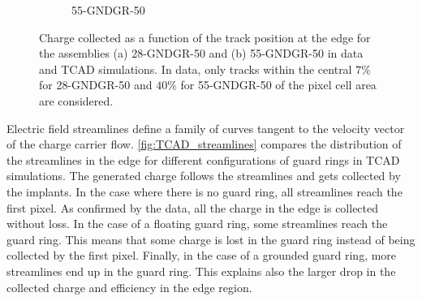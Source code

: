 \begin{figure}[htbp]
\begin{subfigure}[b]{0.45\textwidth}
    \caption{55-GNDGR-50}
  \end{subfigure}
  \caption{Charge collected as a function of the track position at the
    edge for the assemblies (a) 28-GNDGR-50 and (b) 55-GNDGR-50 in
    data and TCAD simulations. In data, only tracks within the central
    $7\%$ for 28-GNDGR-50 and $40\%$ for 55-GNDGR-50 of the pixel cell
    area are considered.}
  \label{fig:ChargeCollectionNGRFGR_50}
\end{figure}


Electric field streamlines define a family of curves tangent to the
velocity vector of the charge carrier
flow. \cref{fig:TCAD_streamlines} compares the distribution of the
streamlines in the edge for different configurations of guard rings in
TCAD simulations. The generated charge follows the streamlines and
gets collected by the implants. In the case where there is no guard
ring, all streamlines reach the first pixel. As confirmed by the data,
all the charge in the edge is collected without loss. In the case of a
floating guard ring, some streamlines reach the guard ring. This means
that some charge is lost in the guard ring instead of being collected
by the first pixel. Finally, in the case of a grounded guard ring,
more streamlines end up in the guard ring. This explains also the
larger drop in the collected charge and efficiency in the edge region.

